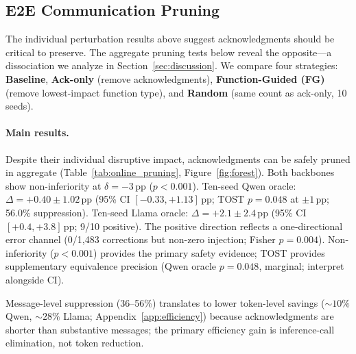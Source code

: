\subsection{E2E Communication Pruning}
\label{sec:e2e_pruning}

The individual perturbation results above suggest acknowledgments should be critical to preserve. The aggregate pruning tests below reveal the opposite---a dissociation we analyze in Section~\ref{sec:discussion}.
We compare four strategies: \textbf{Baseline}, \textbf{Ack-only} (remove acknowledgments), \textbf{Function-Guided (FG)} (remove lowest-impact function type), and \textbf{Random} (same count as ack-only, 10 seeds).

\paragraph{Main results.} Despite their individual disruptive impact, acknowledgments can be safely pruned in aggregate (Table~\ref{tab:online_pruning}, Figure~\ref{fig:forest}). Both backbones show non-inferiority at $\delta = -3$\,pp ($p < 0.001$). Ten-seed Qwen oracle: $\Delta = +0.40 \pm 1.02$\,pp (95\% CI $[-0.33, +1.13]$\,pp; TOST $p = 0.048$ at $\pm 1$\,pp; 56.0\% suppression). Ten-seed Llama oracle: $\Delta = +2.1 \pm 2.4$\,pp (95\% CI $[+0.4, +3.8]$\,pp; 9/10 positive). The positive direction reflects a one-directional error channel (0/1{,}483 corrections but non-zero injection; Fisher $p = 0.004$).
Non-inferiority ($p < 0.001$) provides the primary safety evidence; TOST provides supplementary equivalence precision (Qwen oracle $p = 0.048$, marginal; interpret alongside CI).

Message-level suppression (36--56\%) translates to lower token-level savings (${\sim}10\%$ Qwen, ${\sim}28\%$ Llama; Appendix~\ref{app:efficiency}) because acknowledgments are shorter than substantive messages; the primary efficiency gain is inference-call elimination, not token reduction.

